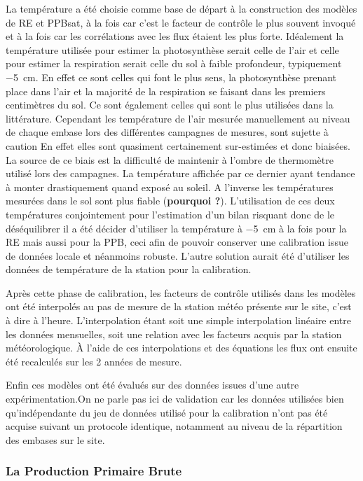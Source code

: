 La température a été choisie comme base de départ à la construction des modèles de RE et PPBsat, à la fois car c'est le facteur de contrôle le plus souvent invoqué et à la fois car les corrélations avec les flux étaient les plus forte.
Idéalement la température utilisée pour estimer la photosynthèse serait celle de l'air et celle pour estimer la respiration serait celle du sol à faible profondeur, typiquement \SI{-5}{\centi\metre}.
En effet ce sont celles qui font le plus sens, la photosynthèse prenant place dans l'air et la majorité de la respiration se faisant dans les premiers centimètres du sol.
Ce sont également celles qui sont le plus utilisées dans la littérature.
Cependant les température de l'air mesurée manuellement au niveau de chaque embase lors des différentes campagnes de mesures, sont sujette à caution 
En effet elles sont quasiment certainement sur-estimées et donc biaisées.
La source de ce biais est la difficulté de maintenir à l'ombre de thermomètre utilisé lors des campagnes.
La température affichée par ce dernier ayant tendance à monter drastiquement quand exposé au soleil.
A l'inverse les températures mesurées dans le sol sont plus fiable (\textbf{pourquoi ?}).
L'utilisation de ces deux températures conjointement pour l'estimation d'un bilan risquant donc de le déséquilibrer il a été décider d'utiliser la température à \SI{-5}{\centi\metre} à la fois pour la RE mais aussi pour la PPB, ceci afin de pouvoir conserver une calibration issue de données locale et néanmoins robuste.
L'autre solution aurait été d'utiliser les données de température de la station pour la calibration.

Après cette phase de calibration, les facteurs de contrôle utilisés dans les modèles ont été interpolés au pas de mesure de la station météo présente sur le site, c'est à dire à l'heure.
L'interpolation étant soit une simple interpolation linéaire entre les données mensuelles, soit une relation avec les facteurs acquis par la station météorologique.
À l'aide de ces interpolations et des équations les flux ont ensuite été recalculés sur les 2 années de mesure.

Enfin ces modèles ont été évalués sur des données issues d'une autre expérimentation.On ne parle pas ici de validation car les données utilisées bien qu'indépendante du jeu de données utilisé pour la calibration n'ont pas été acquise suivant un protocole identique, notamment au niveau de la répartition des embases sur le site.


\subsubsection{La Production Primaire Brute}




